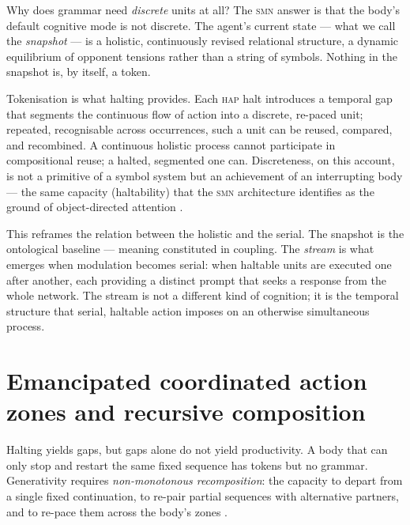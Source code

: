 \documentclass{article}
\newcommand{\smn}{\textsc{smn}}
\newcommand{\hap}{\textsc{hap}}
\begin{document}
Why does grammar need \emph{discrete} units at all? The \smn{} answer is that the body's default cognitive mode is not discrete. The agent's current state --- what we call the \emph{snapshot} --- is a holistic, continuously revised relational structure, a dynamic equilibrium of opponent tensions rather than a string of symbols. Nothing in the snapshot is, by itself, a token.

Tokenisation is what halting provides. Each \hap{} halt introduces a temporal gap that segments the continuous flow of action into a discrete, re-paced unit; repeated, recognisable across occurrences, such a unit can be reused, compared, and recombined. A continuous holistic process cannot participate in compositional reuse; a halted, segmented one can. Discreteness, on this account, is not a primitive of a symbol system but an achievement of an interrupting body --- the same capacity (haltability) that the \smn{} architecture identifies as the ground of object-directed attention \citep{NagarjunaKarnam2026SMN}.

This reframes the relation between the holistic and the serial. The snapshot is the ontological baseline --- meaning constituted in coupling. The \emph{stream} is what emerges when modulation becomes serial: when haltable units are executed one after another, each providing a distinct prompt that seeks a response from the whole network. The stream is not a different kind of cognition; it is the temporal structure that serial, haltable action imposes on an otherwise simultaneous process.

\section{Emancipated coordinated action zones and recursive composition}\label{sec:ecaz}

Halting yields gaps, but gaps alone do not yield productivity. A body that can only stop and restart the same fixed sequence has tokens but no grammar. Generativity requires \emph{non-monotonous recomposition}: the capacity to depart from a single fixed continuation, to re-pair partial sequences with alternative partners, and to re-pace them across the body's zones \citep{Lashley1951SerialOrder}.
\end{document}
